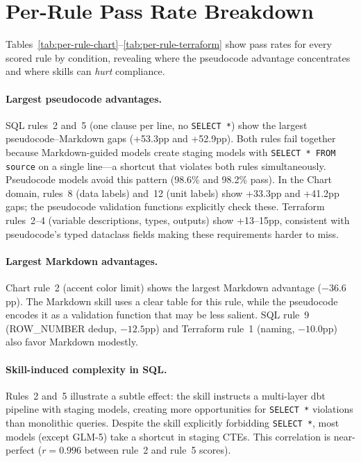 \documentclass[sigconf,nonacm]{acmart}
\begin{document}
\section{Per-Rule Pass Rate Breakdown}\label{app:per-rule}

Tables~\ref{tab:per-rule-chart}--\ref{tab:per-rule-terraform} show pass rates
for every scored rule by condition, revealing where the pseudocode advantage
concentrates and where skills can \emph{hurt} compliance.

\paragraph{Largest pseudocode advantages.}
SQL rules~2 and~5 (one clause per line, no \texttt{SELECT~*}) show the
largest pseudocode--Markdown gaps (+53.3pp and +52.9pp). Both rules fail
together because Markdown-guided models create staging models with
\texttt{SELECT * FROM source} on a single line---a shortcut that violates
both rules simultaneously. Pseudocode models avoid this pattern (98.6\%
and 98.2\% pass). In the Chart domain, rules~8 (data labels) and~12 (unit
labels) show +33.3pp and +41.2pp gaps; the pseudocode validation functions
explicitly check these. Terraform rules~2--4 (variable descriptions, types,
outputs) show +13--15pp, consistent with pseudocode's typed dataclass
fields making these requirements harder to miss.

\paragraph{Largest Markdown advantages.}
Chart rule~2 (accent color limit) shows the largest Markdown advantage
($-36.6$pp). The Markdown skill uses a clear table for this rule,
while the pseudocode encodes it as a validation function that may be
less salient. SQL rule~9 (ROW\_NUMBER dedup, $-12.5$pp) and Terraform
rule~1 (naming, $-10.0$pp) also favor Markdown modestly.

\paragraph{Skill-induced complexity in SQL.}
Rules~2 and~5 illustrate a subtle effect: the skill instructs a
multi-layer dbt pipeline with staging models, creating more
opportunities for \texttt{SELECT~*} violations than monolithic queries.
Despite the skill explicitly forbidding \texttt{SELECT~*}, most models
(except GLM-5) take a shortcut in staging CTEs. This correlation is
near-perfect ($r = 0.996$ between rule~2 and rule~5 scores).
\end{document}
